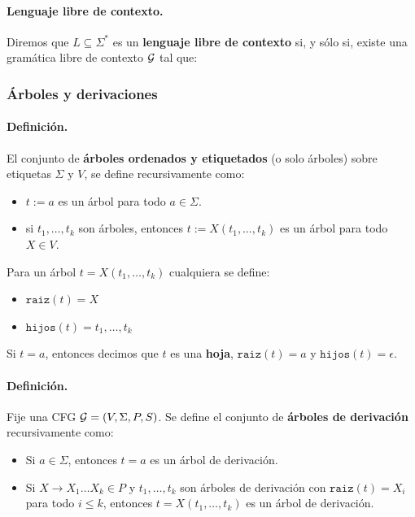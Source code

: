 \paragraph{Lenguaje libre de contexto.} Diremos que $L \subseteq \Sigma^*$ es un \textbf{lenguaje libre de contexto} si, y sólo si, existe una gramática libre de contexto $\mathcal{G}$ tal que:


\subsubsection{Árboles y derivaciones}

\paragraph{Definición.} El conjunto de \textbf{árboles ordenados y etiquetados} (o solo árboles) sobre etiquetas $\Sigma$ y $V$, se define recursivamente como:
\begin{itemize}
    \item $t:=a$ es un árbol para todo $a \in \Sigma$.
    \item si $t_1,\ldots, t_k$ son árboles, entonces $t:= X(t_1, \ldots, t_k)$ es un árbol para todo $X \in V$.
\end{itemize}

Para un árbol $t = X(t_1,\ldots,t_k)$ cualquiera se define:
\begin{itemize}
    \item $\texttt{raiz}(t)=X$
    \item $\texttt{hijos}(t)= t_1,\ldots,t_k$
\end{itemize}

Si $t = a$, entonces decimos que $t$ es una \textbf{hoja}, $\texttt{raiz}(t) = a$ y $\texttt{hijos}(t) = \epsilon$.

\paragraph{Definición.} Fije una CFG $\mathcal{G} = (V, \Sigma, P, S)$. Se define el conjunto de \textbf{árboles de derivación} recursivamente como:
\begin{itemize}
    \item Si $a \in \Sigma$, entonces $t = a$ es un árbol de derivación.
    \item Si $X \to X_1 \ldots X_k \in P$ y $t_1,\ldots,t_k$ son árboles de derivación con $\texttt{raiz}(t) = X_i$ para todo $i \leq k$, entonces $t = X(t_1,\ldots,t_k)$ es un árbol de derivación.
\end{itemize}

